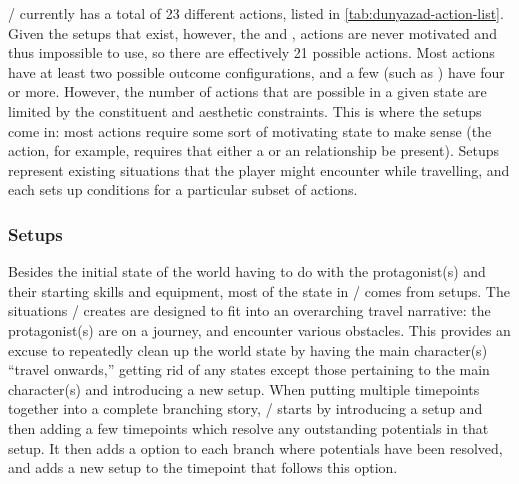 \dunyazad/ currently has a total of 23 different actions, listed in \cref{tab:dunyazad-action-list}.
%
Given the setups that exist, however, the  and , actions are never motivated and thus impossible to use, so there are effectively 21 possible actions.
%
Most actions have at least two possible outcome configurations, and a few (such as ) have four or more.
%
However, the number of actions that are possible in a given state are limited by the constituent and aesthetic constraints.
%
This is where the setups come in: most actions require some sort of motivating state to make sense (the  action, for example, requires that either a  or an  relationship be present).
%
Setups represent existing situations that the player might encounter while travelling, and each sets up conditions for a particular subset of actions.


\subsubsection{Setups}

Besides the initial state of the world having to do with the protagonist(s) and their starting skills and equipment, most of the state in \dunyazad/ comes from setups.
%
The situations \dunyazad/ creates are designed to fit into an overarching travel narrative: the protagonist(s) are on a journey, and encounter various obstacles.
%
This provides an excuse to repeatedly clean up the world state by having the main character(s) ``travel onwards,'' getting rid of any states except those pertaining to the main character(s) and introducing a new setup.
%
When putting multiple timepoints together into a complete branching story, \dunyazad/ starts by introducing a setup and then adding a few timepoints which resolve any outstanding potentials in that setup.
%
It then adds a  option to each branch where potentials have been resolved, and adds a new setup to the timepoint that follows this option.


